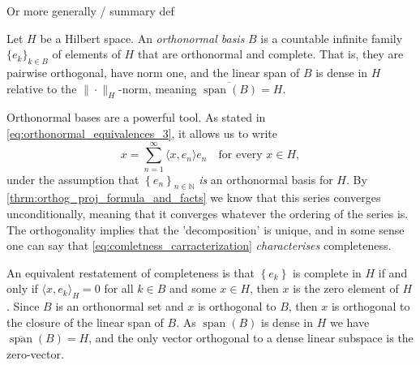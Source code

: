 \documentclass[../thesis.tex]{subfiles}
\begin{document}
Or more generally  / summary def

\begin{definition}
    Let $H$ be a Hilbert space. An \emph{orthonormal basis} $B$ is a countable infinite family $\{e_k\}_{k\in B}$ of elements of $H$ that are orthonormal and complete. That is, they are pairwise orthogonal, have norm one, and the linear span of $B$ is dense in $H$ relative to the $\|\cdot\|_H$-norm, meaning $\overline{\operatorname{span}(B)} = H$. 
\end{definition}


Orthonormal bases are a powerful tool. As stated in \cref{eq:orthonormal_equivalences_3}, it allows us to write
\begin{equation}\label{eq:comletness_carracterization}
    x= \sum_{n=1}^{\infty} \langle x, e_n \rangle e_n \quad \text{for every } x\in H,
\end{equation}
under the assumption that $\left\{ e_{n} \right\}_{n\in \mathbb{N}}$ \emph{is} an orthonormal basis for $H$.  By \cref{thrm:orthog_proj_formula_and_facts} we know that this series converges unconditionally, meaning that it converges whatever the ordering of the series is. The orthogonality implies that the 'decomposition' is unique, and in some sense one can say that \cref{eq:comletness_carracterization} \emph{characterises} completeness. %

An equivalent restatement of completeness is that $\left\{ e_k \right\}$ is complete in $H$ if and only if $\langle x, e_k \rangle_{H} = 0$ for all $k\in B$ and some $x\in H$, then $x$ is the zero element of $H$. Since $B$ is an orthonormal set and $x$ is orthogonal to $B$, then $x$ is orthogonal to the closure of the linear span of $B$. As $\operatorname{span}(B)$ is dense in $H$ we have $\overline{\operatorname{span}}(B) = H$, and the only vector orthogonal to a dense linear subspace is the zero-vector. 


\end{document}
